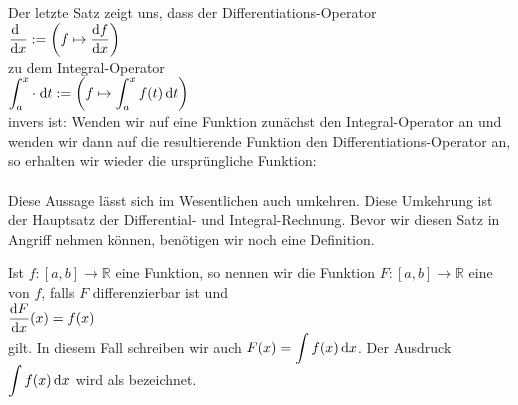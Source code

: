 \remark
Der letzte Satz zeigt uns, dass der Differentiations-Operator
\\[0.2cm]
\hspace*{1.3cm}
$\displaystyle\frac{\textrm{d}\,\;}{\textrm{d}x} := \left(f \mapsto \frac{\textrm{d}f}{\textrm{d}x} \right)$ 
\\[0.2cm]
zu dem Integral-Operator
\\[0.2cm]
\hspace*{1.3cm}
$\displaystyle\int_{a}^x \cdot \;\textrm{d} t := \left(f \mapsto \int_a^x f(t) \, \textrm{d} t\right)$ 
\\[0.2cm]
invers ist: Wenden wir auf eine Funktion zun\"achst den
Integral-Operator an und wenden wir dann auf die resultierende Funktion den
Differentiations-Operator an, so erhalten wir wieder die urspr\"ungliche Funktion:
\\[0.2cm]
\hspace*{1.3cm}
\colorbox{red}{\colorbox{orange}{}}
\\[0.2cm]
Diese Aussage
l\"asst sich im Wesentlichen auch umkehren.  Diese Umkehrung ist der Hauptsatz der Differential- und
Integral-Rechnung.  Bevor wir diesen Satz in Angriff nehmen k\"onnen, ben\"otigen wir noch eine Definition.
\pagebreak

\begin{Definition} \lb
Ist $f:[a,b] \rightarrow \mathbb{R}$ eine Funktion, so nennen wir die Funktion  $F:[a,b]\rightarrow\mathbb{R}$ 
eine  von $f$, falls $F$ differenzierbar ist und 
\\[0.2cm]
\hspace*{1.3cm} $\displaystyle\frac{\textrm{d}F}{\textrm{d}x}(x) = f(x)$
\\[0.2cm]
gilt.  In diesem Fall schreiben wir auch  $\displaystyle F(x) = \int f(x) \, \textrm{d} x$.
Der Ausdruck $\displaystyle\int f(x) \, \textrm{d} x$ wird als 
 bezeichnet. \eod
\end{Definition}

